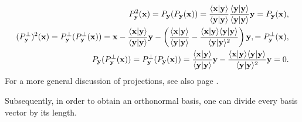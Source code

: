 \begin{equation}
\begin{split}
P_{{\bf y}}^2({\bf x})  = P_{{\bf y}}(P_{{\bf y}}({\bf x}) ) =
\frac{\langle {\bf x}\vert {\bf y} \rangle }
{\langle {\bf y}\vert {\bf y} \rangle }
\frac{\langle {\bf y}\vert {\bf y} \rangle }
{\langle {\bf y}\vert {\bf y} \rangle }
{\bf y} =P_{{\bf y}}({\bf x}),  \\
%
(P_{{\bf y}}^\perp)^2({\bf x})  = P_{{\bf y}}^\perp(P_{{\bf y}}^\perp({\bf x}) ) =
{\bf x}- \frac{\langle {\bf x}\vert {\bf y} \rangle }{\langle {\bf y}\vert {\bf y} \rangle }{\bf y}
-\left(
\frac{\langle {\bf x}\vert {\bf y} \rangle }{\langle {\bf y}\vert {\bf y} \rangle }
-
\frac{\langle {\bf x}\vert {\bf y} \rangle \langle {\bf y}\vert {\bf y}
\rangle}{\langle {\bf y}\vert {\bf y} \rangle^2 }
\right)
{\bf y},
=P_{{\bf y}}^\perp({\bf x}),  \\
P_{{\bf y}}(P_{{\bf y}}^\perp({\bf x}) ) =  P_{{\bf y}}^\perp(P_{{\bf y}}({\bf x}) ) =
\frac{\langle {\bf x}\vert {\bf y} \rangle }{\langle {\bf y}\vert {\bf y} \rangle }{\bf y}
-
\frac{\langle {\bf x}\vert {\bf y} \rangle \langle {\bf y}\vert {\bf y} \rangle}{\langle {\bf y}\vert {\bf y} \rangle^2 }
{\bf y}
=0.
\end{split}
\end{equation}
For a more general discussion of projections, see also page \pageref{2011-m-projec}.

Subsequently, in order to obtain an orthonormal basis,
one can divide every basis vector by its length.

